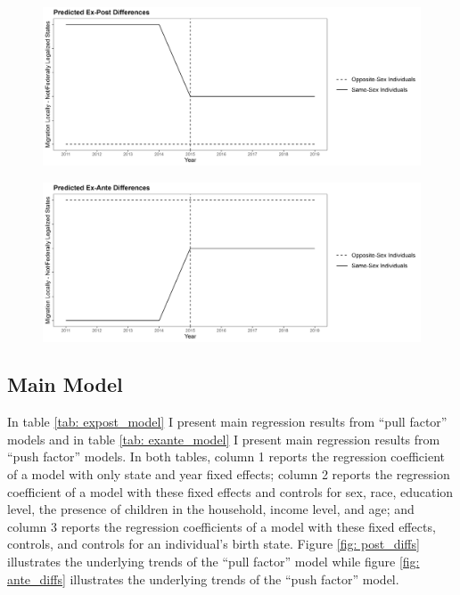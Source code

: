 \documentclass[12pt,letterpaper]{article}
\begin{document}
\begin{centering}
\begin{figure}
    \centering
    \includegraphics[width=0.75\linewidth]{outputs/summary_stats/ex_post_diffs.png}
    \caption{}
    \label{fig: ex_post_diffs}
\end{figure}

\begin{figure}
    \centering
    \includegraphics[width=0.75\linewidth]{outputs/summary_stats/ex_ante_diffs.png}
    \caption{}
    \label{fig: ex_ante_diffs}
\end{figure}
\end{centering}

\clearpage
\subsection{Main Model} %
In table \ref{tab: expost_model} I present main regression results from “pull factor” models and in table \ref{tab: exante_model} I present main regression results from “push factor” models. In both tables, column 1 reports the regression coefficient of a model with only state and year fixed effects; column 2 reports the regression coefficient of a model with these fixed effects and controls for sex, race, education level, the presence of children in the household, income level, and age; and column 3 reports the regression coefficients of a model with these fixed effects, controls, and controls for an individual’s birth state. Figure \ref{fig: post_diffs} illustrates the underlying trends of the “pull factor” model while figure \ref{fig: ante_diffs} illustrates the underlying trends of the “push factor” model. 
\end{document}
